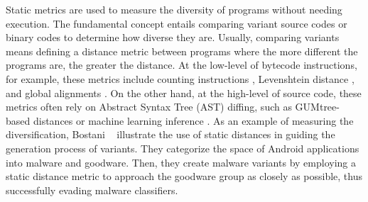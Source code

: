 \begin{strategy}
    \label{static_based}
    Static metrics are used to measure the diversity of programs without needing execution. 
    The fundamental concept entails comparing variant source codes or binary codes to determine how diverse they are. 
    Usually, comparing variants means defining a distance metric between programs \cite{10.1145/2814270.2814319} where the more different the programs are, the greater the distance. 
    At the low-level of bytecode instructions, for example, these metrics include counting instructions \cite{10.1007/978-3-642-00730-9_10}, Levenshtein distance \cite{DBLP:journals/corr/abs-2111-09934}, and global alignments \cite{CROW}. 
    On the other hand, at the high-level of source code, these metrics often rely on Abstract Syntax Tree (AST) diffing, such as GUMtree-based distances \cite{gumtree} or machine learning inference \cite{203634}. 
    As an example of measuring the diversification, Bostani \etal~\cite{Bostani2021EvadeDroidAP} illustrate the use of static distances in guiding the generation process of variants. 
    They categorize the space of Android applications into malware and goodware. 
    Then, they create malware variants by employing a static distance metric to approach the goodware group as closely as possible, thus successfully evading malware classifiers.
\end{strategy}

